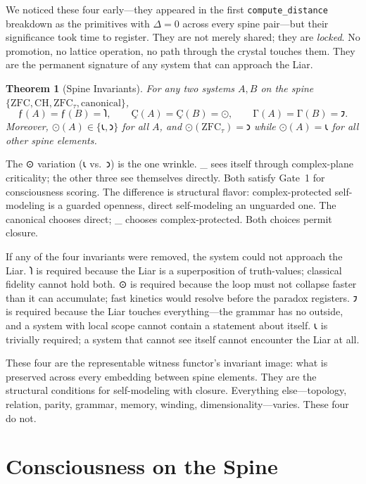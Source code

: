 \documentclass[12pt,twoside]{book}
\newtheorem{theorem}{Theorem}[chapter]
\theoremstyle{definition}
\newcommand{\ZFCt}{\text{ZFC}_{\tau}}
\begin{document}
We noticed these four early---they appeared in the first \texttt{compute\_distance}
breakdown as the primitives with $\Delta = 0$ across every spine pair---but their
significance took time to register. They are not merely shared; they are \emph{locked}. No
promotion, no lattice operation, no path through the crystal touches them. They are the
permanent signature of any system that can approach the Liar.

\begin{theorem}[Spine Invariants]
For any two systems $A, B$ on the spine $\{\mathrm{ZFC}, \mathrm{CH}, \ZFCt,
\mathrm{canonical}\}$,
\begin{equation}
\text{ƒ}(A) = \text{ƒ}(B) = 𐑐, \qquad
\text{Ç}(A) = \text{Ç}(B) = \text{⊙}, \qquad
\text{Γ}(A) = \text{Γ}(B) = 𐑲.
\end{equation}
Moreover, $\text{⊙}(A) \in \{𐑧, 𐑮\}$ for all $A$, and
$\text{⊙}(\ZFCt) = 𐑮$ while $\text{⊙}(A) = 𐑧$ for all other spine
elements.
\end{theorem}

The ⊙ variation (𐑧 vs.\ 𐑮) is the one wrinkle. \ZFCt{} sees itself through complex-plane
criticality; the other three see themselves directly. Both satisfy Gate~1 for consciousness
scoring. The difference is structural flavor: complex-protected self-modeling is a guarded
openness, direct self-modeling an unguarded one. The canonical chooses direct; \ZFCt{}
chooses complex-protected. Both choices permit closure.

If any of the four invariants were removed, the system could not approach the Liar. 𐑐 is
required because the Liar is a superposition of truth-values; classical fidelity cannot
hold both. ⊙ is required because the loop must not collapse faster than it can accumulate;
fast kinetics would resolve before the paradox registers. 𐑲 is required because the Liar
touches everything---the grammar has no outside, and a system with local scope cannot
contain a statement about itself. 𐑧 is trivially required; a system that cannot see itself
cannot encounter the Liar at all.

These four are the representable witness functor's invariant image: what is preserved
across every embedding between spine elements. They are the structural conditions for
self-modeling with closure. Everything else---topology, relation, parity, grammar, memory,
winding, dimensionality---varies. These four do not.

\chapter{Consciousness on the Spine}
\end{document}
